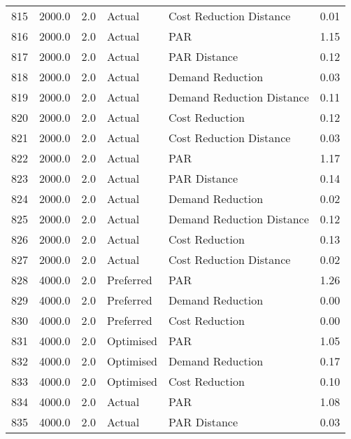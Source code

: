 \begin{longtable}{lrrllr}
815  &       2000.0 &     2.0 &         Actual &    Cost Reduction Distance &   0.01 \\
816  &       2000.0 &     2.0 &         Actual &                        PAR &   1.15 \\
817  &       2000.0 &     2.0 &         Actual &               PAR Distance &   0.12 \\
818  &       2000.0 &     2.0 &         Actual &           Demand Reduction &   0.03 \\
819  &       2000.0 &     2.0 &         Actual &  Demand Reduction Distance &   0.11 \\
820  &       2000.0 &     2.0 &         Actual &             Cost Reduction &   0.12 \\
821  &       2000.0 &     2.0 &         Actual &    Cost Reduction Distance &   0.03 \\
822  &       2000.0 &     2.0 &         Actual &                        PAR &   1.17 \\
823  &       2000.0 &     2.0 &         Actual &               PAR Distance &   0.14 \\
824  &       2000.0 &     2.0 &         Actual &           Demand Reduction &   0.02 \\
825  &       2000.0 &     2.0 &         Actual &  Demand Reduction Distance &   0.12 \\
826  &       2000.0 &     2.0 &         Actual &             Cost Reduction &   0.13 \\
827  &       2000.0 &     2.0 &         Actual &    Cost Reduction Distance &   0.02 \\
828  &       4000.0 &     2.0 &      Preferred &                        PAR &   1.26 \\
829  &       4000.0 &     2.0 &      Preferred &           Demand Reduction &   0.00 \\
830  &       4000.0 &     2.0 &      Preferred &             Cost Reduction &   0.00 \\
831  &       4000.0 &     2.0 &      Optimised &                        PAR &   1.05 \\
832  &       4000.0 &     2.0 &      Optimised &           Demand Reduction &   0.17 \\
833  &       4000.0 &     2.0 &      Optimised &             Cost Reduction &   0.10 \\
834  &       4000.0 &     2.0 &         Actual &                        PAR &   1.08 \\
835  &       4000.0 &     2.0 &         Actual &               PAR Distance &   0.03 \\

\end{longtable}

